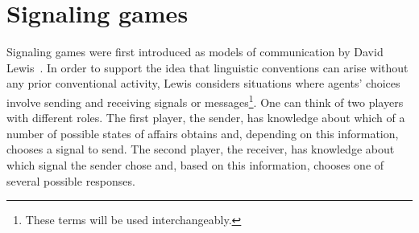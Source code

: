 \documentclass[a4paper]{article}
\begin{document}
\section{Signaling games}
\label{sec:signaling-games}

Signaling games were first introduced as models of communication by David Lewis~\parencite*{lewis_convention_1969}.
In order to support the idea that linguistic conventions can arise without any prior conventional activity, Lewis considers situations where agents' choices involve sending and receiving signals or messages\footnote{These terms will be used interchangeably.}.
One can think of two players with different roles.
The first player, the sender, has knowledge about which of a number of possible states of affairs obtains and, depending on this information, chooses a signal to send.
The second player, the receiver, has knowledge about which signal the sender chose and, based on this information, chooses one of several possible responses.
\end{document}
